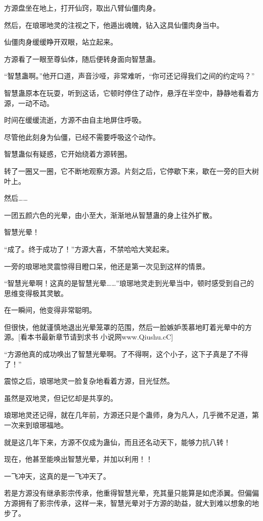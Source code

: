 
\begin{this_body}

方源盘坐在地上，打开仙窍，取出八臂仙僵肉身。

然后，在琅琊地灵的注视之下，他遁出魂魄，钻入这具仙僵肉身当中。

仙僵肉身缓缓睁开双眼，站立起来。

方源看了一眼至尊仙体，随后便转身面向智慧蛊。

“智慧蛊啊。”他开口道，声音沙哑，非常难听，“你可还记得我们之间的约定吗？”

智慧蛊原本在玩耍，听到这话，它顿时停住了动作，悬浮在半空中，静静地看着方源，一动不动。

时间在缓缓流逝，方源不由自主地屏住呼吸。

尽管他此刻身为仙僵，已经不需要呼吸这个动作。

智慧蛊似有疑惑，它开始绕着方源转圈。

转了一圈又一圈，它不断地观察方源。片刻之后，它停歇下来，歇在一旁的巨大树叶上。

然后……

一团五颜六色的光晕，由小至大，渐渐地从智慧蛊的身上往外扩散。

智慧光晕！

“成了。终于成功了！”方源大喜，不禁哈哈大笑起来。

一旁的琅琊地灵震惊得目瞪口呆，他还是第一次见到这样的情景。

“智慧光晕啊！这真的是智慧光晕……”琅琊地灵走到光晕当中，顿时感受到自己的思维变得极其灵敏。

在一瞬间，他变得非常聪明。

但很快，他就谨慎地退出光晕笼罩的范围，然后一脸嫉妒羡慕地盯着光晕中的方源。[看本书最新章节请到求书 小说网www.Qiushu.cC]

“方源他真的成功唤出了智慧光晕啊。了不得啊，这个小子，这下子真是了不得了！”

震惊之后，琅琊地灵一脸复杂地看着方源，目光怔然。

虽然是双地灵，但记忆却是共享的。

琅琊地灵还记得，就在几年前，方源还只是个蛊师，身为凡人，几乎微不足道，第一次来到琅琊福地。

就是这几年下来，方源不仅成为蛊仙，而且还名动天下，能够力抗八转！

现在，他甚至能唤出智慧光晕，并加以利用！！

一飞冲天，这真的是一飞冲天了。

若是方源没有继承影宗传承，他重得智慧光晕，充其量只能算是如虎添翼。但偏偏方源拥有了影宗传承，这样一来，智慧光晕对于方源的助益，就大到难以想象的地步了。


\end{this_body}

